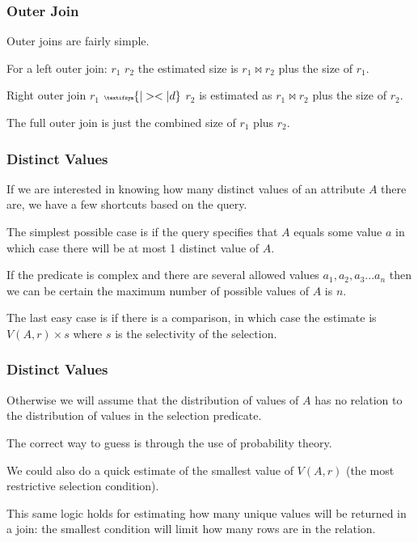 \begin{frame}
\frametitle{Outer Join}

Outer joins are fairly simple. 

For a left outer join: $r_{1}$ {\tiny {}} $r_{2}$ the estimated size is $r_{1} \bowtie r_{2}$ plus the size of $r_{1}$.

Right outer join $r_{1}$ ${\tiny \textifsym{|><|d}}$ $r_{2}$ is estimated as $r_{1} \bowtie r_{2}$ plus the size of $r_{2}$. 

The full outer join {\tiny {}} is just the combined size of $r_{1}$ plus $r_{2}$.


\end{frame}

\begin{frame}
\frametitle{Distinct Values}

If we are interested in knowing how many distinct values of an attribute $A$ there are, we have a few shortcuts based on the query. 

The simplest possible case is if the query specifies that $A$ equals some value $a$ in which case there will be at most 1 distinct value of $A$. 

If the predicate is complex and there are several allowed values $a_{1}, a_{2}, a_{3}... a_{n}$ then we can be certain the maximum number of possible values of $A$ is $n$. 

The last easy case is if there is a comparison, in which case the estimate is $V(A,r) \times s$ where $s$ is the selectivity of the selection.


\end{frame}


\begin{frame}
\frametitle{Distinct Values}

Otherwise we will assume that the distribution of values of $A$ has no relation to the distribution of values in the selection predicate. 

The correct way to guess is through the use of probability theory. 

We could also do a quick estimate of the smallest value of $V(A, r)$ (the most restrictive selection condition). 

This same logic holds for estimating how many unique values will be returned in a join: the smallest condition will limit how many rows are in the relation.

\end{frame}


